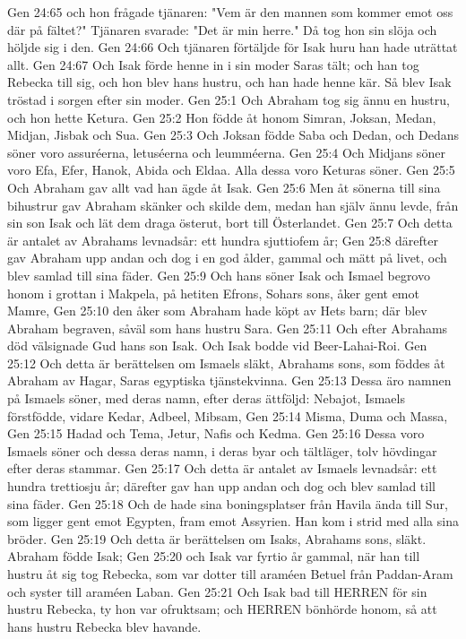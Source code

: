 Gen 24:65  och hon frågade tjänaren: "Vem är den mannen som kommer emot oss där på fältet?" Tjänaren svarade: "Det är min herre." Då tog hon sin slöja och höljde sig i den.
Gen 24:66  Och tjänaren förtäljde för Isak huru han hade uträttat allt.
Gen 24:67  Och Isak förde henne in i sin moder Saras tält; och han tog Rebecka till sig, och hon blev hans hustru, och han hade henne kär. Så blev Isak tröstad i sorgen efter sin moder.
Gen 25:1  Och Abraham tog sig ännu en hustru, och hon hette Ketura.
Gen 25:2  Hon födde åt honom Simran, Joksan, Medan, Midjan, Jisbak och Sua.
Gen 25:3  Och Joksan födde Saba och Dedan, och Dedans söner voro assuréerna, letuséerna och leumméerna.
Gen 25:4  Och Midjans söner voro Efa, Efer, Hanok, Abida och Eldaa. Alla dessa voro Keturas söner.
Gen 25:5  Och Abraham gav allt vad han ägde åt Isak.
Gen 25:6  Men åt sönerna till sina bihustrur gav Abraham skänker och skilde dem, medan han själv ännu levde, från sin son Isak och lät dem draga österut, bort till Österlandet.
Gen 25:7  Och detta är antalet av Abrahams levnadsår: ett hundra sjuttiofem år;
Gen 25:8  därefter gav Abraham upp andan och dog i en god ålder, gammal och mätt på livet, och blev samlad till sina fäder.
Gen 25:9  Och hans söner Isak och Ismael begrovo honom i grottan i Makpela, på hetiten Efrons, Sohars sons, åker gent emot Mamre,
Gen 25:10  den åker som Abraham hade köpt av Hets barn; där blev Abraham begraven, såväl som hans hustru Sara.
Gen 25:11  Och efter Abrahams död välsignade Gud hans son Isak. Och Isak bodde vid Beer-Lahai-Roi.
Gen 25:12  Och detta är berättelsen om Ismaels släkt, Abrahams sons, som föddes åt Abraham av Hagar, Saras egyptiska tjänstekvinna.
Gen 25:13  Dessa äro namnen på Ismaels söner, med deras namn, efter deras ättföljd: Nebajot, Ismaels förstfödde, vidare Kedar, Adbeel, Mibsam,
Gen 25:14  Misma, Duma och Massa,
Gen 25:15  Hadad och Tema, Jetur, Nafis och Kedma.
Gen 25:16  Dessa voro Ismaels söner och dessa deras namn, i deras byar och tältläger, tolv hövdingar efter deras stammar.
Gen 25:17  Och detta är antalet av Ismaels levnadsår: ett hundra trettiosju år; därefter gav han upp andan och dog och blev samlad till sina fäder.
Gen 25:18  Och de hade sina boningsplatser från Havila ända till Sur, som ligger gent emot Egypten, fram emot Assyrien. Han kom i strid med alla sina bröder.
Gen 25:19  Och detta är berättelsen om Isaks, Abrahams sons, släkt. Abraham födde Isak;
Gen 25:20  och Isak var fyrtio år gammal, när han till hustru åt sig tog Rebecka, som var dotter till araméen Betuel från Paddan-Aram och syster till araméen Laban.
Gen 25:21  Och Isak bad till HERREN för sin hustru Rebecka, ty hon var ofruktsam; och HERREN bönhörde honom, så att hans hustru Rebecka blev havande.

